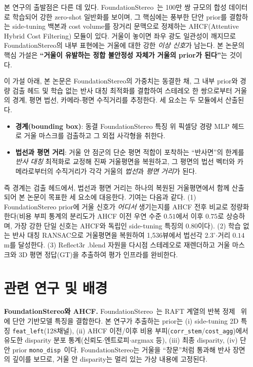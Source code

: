 \documentclass[10pt,a4paper]{article}
\begin{document}
본 연구의 출발점은 다른 데 있다. FoundationStereo~\cite{foundationstereo2025}는 100만 쌍 규모의 합성 데이터로 학습되어 강한 zero-shot 일반화를 보이며, 그 핵심에는 풍부한 단안 prior를 결합하는 side-tuning 백본과 cost volume를 장거리 문맥으로 정제하는 AHCF(Attentive Hybrid Cost Filtering) 모듈이 있다. 거울이 놓이면 좌우 광도 일관성이 깨지므로 FoundationStereo의 내부 표현에는 거울에 대한 강한 \emph{이상 신호}가 남는다. 본 논문의 핵심 가설은 \textbf{``거울이 유발하는 정합 불안정성 자체가 거울의 prior가 된다''}는 것이다.

이 가설 아래, 본 논문은 FoundationStereo의 가중치는 동결한 채, 그 내부 prior와 경량 검출 헤드 및 학습 없는 반사 대칭 최적화를 결합하여 스테레오 한 쌍으로부터 거울의 경계, 평면 법선, 카메라-평면 수직거리를 추정한다. 세 요소는 두 모듈에서 산출된다.
\begin{itemize}[leftmargin=1.2em,itemsep=1pt,topsep=2pt]
  \item \textbf{경계(bounding box)}: 동결 FoundationStereo 특징 위 픽셀당 경량 MLP 헤드로 거울 마스크를 검출하고 그 외접 사각형을 취한다.
  \item \textbf{법선과 평면 거리}: 거울 안 점군의 단순 평면 적합이 포착하는 ``반사면''의 한계를 \emph{반사 대칭} 최적화로 교정해 진짜 거울평면을 복원하고, 그 평면의 법선 벡터와 카메라로부터의 수직거리가 각각 거울의 \emph{법선}과 \emph{평면 거리}가 된다.
\end{itemize}
즉 경계는 검출 헤드에서, 법선과 평면 거리는 하나의 복원된 거울평면에서 함께 산출되어 본 논문이 목표한 세 요소에 대응한다. 기여는 다음과 같다. (1) FoundationStereo prior에 거울 신호가 \emph{어디서} 생기는지를 AHCF 전후 비교로 정량화한다(비용 부피 통계의 분리도가 AHCF 이전 우연 수준 $0.51$에서 이후 $0.75$로 상승하며, 가장 강한 단일 신호는 AHCF와 독립인 side-tuning 특징의 $0.80$이다). (2) 학습 없는 반사 대칭 RANSAC으로 거울평면을 복원하여 1{,}536뷰에서 법선각 $2.3^\circ$$\cdot$거리 $0.14$\,m를 달성한다. (3) Reflect3r .blend 자원을 다시점 스테레오로 재렌더하고 거울 마스크와 3D 평면 정답(GT)을 추출하여 평가 인프라를 완비한다.

\section{관련 연구 및 배경}

\noindent\textbf{FoundationStereo와 AHCF.} FoundationStereo~\cite{foundationstereo2025}는 RAFT 계열의 반복 정제~\cite{raftstereo2021} 위에 단안 기반모델 특징을 결합한다. 본 연구가 추출하는 prior는 (i) side-tuning 2D 특징 \texttt{feat\_left}(128채널), (ii) AHCF 이전/이후 비용 부피(\texttt{corr\_stem}/\texttt{cost\_agg})에서 유도한 disparity 분포 통계(신뢰도$\cdot$엔트로피$\cdot$argmax 등), (iii) 최종 disparity, (iv) 단안 prior \texttt{mono\_disp}~\cite{depthanythingv2}이다. FoundationStereo는 거울을 ``창문''처럼 통과해 반사 장면의 깊이를 보므로, 거울 안 disparity는 멀리 있는 가상 내용에 고정된다.
\end{document}
